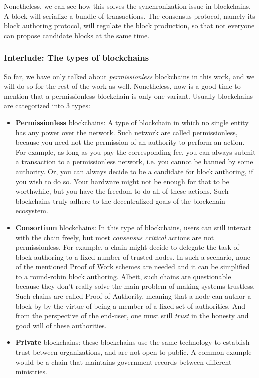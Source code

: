 Nonetheless, we can see how this solves the synchronization issue in blockchains. A block will
serialize a bundle of transactions. The consensus protocol, namely its block authoring protocol,
will regulate the block production, so that not everyone can propose candidate blocks at the same
time.

\subsubsection{Interlude: The types of blockchains}

So far, we have only talked about \textit{permissionless} blockchains in this work, and we will do
so for the rest of the work as well. Nonetheless, now is a good time to mention that a
permissionless blockchain is only one variant. Usually blockchains are categorized into 3 types:

\begin{itemize}
	\item \textbf{Permissionless} blockchains: A type of blockchain in which no single entity has
	any power over the network. Such network are called permissionless, because you need not the
	permission of an authority to perform an action. For example, as long as you pay the
	corresponding fee, you can always submit a transaction to a permissionless network, i.e. you
	cannot be banned by some authority. Or, you can always decide to be a candidate for block
	authoring, if you wish to do so. Your hardware might not be enough for that to be worthwhile,
	but you have the freedom to do all of these actions. Such blockchains truly adhere to the
	decentralized goals of the blockchain ecosystem.
	\item \textbf{Consortium} blockchains: In this type of blockchains, users can still interact
	with the chain freely, but most \textit{consensus critical} actions are not permissionless. For
	example, a chain might decide to delegate the task of block authoring to a fixed number of
	trusted nodes. In such a scenario, none of the mentioned Proof of Work schemes are needed and it
	can be simplified to a round-robin block authoring. Albeit, such chains are questionable because
	they don't really solve the main problem of making systems trustless. Such chains are called
	Proof of Authority, meaning that a node can author a block by by the virtue of being a member of
	a fixed set of authorities. And from the perspective of the end-user, one must still
	\textit{trust} in the honesty and good will of these authorities.
	\item \textbf{Private} blockchains: these blockchains use the same technology to establish trust
	between organizations, and are not open to public. A common example would be a chain that
	maintains government records between different ministries.
\end{itemize}

